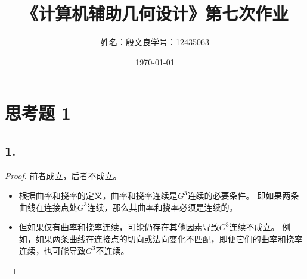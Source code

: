 \documentclass[utf8]{ctexart}
\title{《计算机辅助几何设计》第七次作业}
\author{姓名：殷文良\qquad 学号：12435063}
\date{\today}
\begin{document}
\maketitle
{}

\section*{思考题 1}
\subsection*{1.}
\begin{proof}
    前者成立，后者不成立。
    \begin{itemize}
        \item 根据曲率和挠率的定义，曲率和挠率连续是$G^3$连续的必要条件。
        即如果两条曲线在连接点处$G^3$连续，那么其曲率和挠率必须是连续的。
        \item 但如果仅有曲率和挠率连续，可能仍存在其他因素导致$G^3$连续不成立。
        例如，如果两条曲线在连接点的切向或法向变化不匹配，即便它们的曲率和挠率连续，也可能导致$G^3$不连续。
    \end{itemize}
\end{proof}
\end{document}
